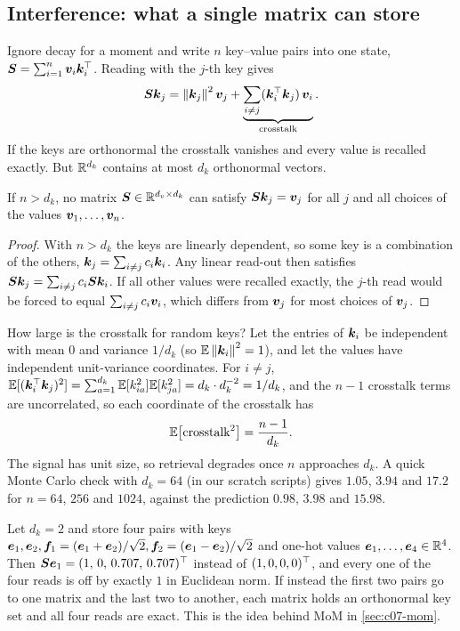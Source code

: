 \subsection{Interference: what a single matrix can store}\label{sec:c07-interference}

Ignore decay for a moment and write $n$ key--value pairs into one state,
$\bm{S} = \sum_{i=1}^{n} \bm{v}_i \bm{k}_i^{\top}$. Reading with the $j$-th key gives
\begin{equation}\label{eq:c07-crosstalk}
  \bm{S} \bm{k}_j = \left\lVert \bm{k}_j\right\rVert^2 \bm{v}_j + \underbrace{\sum_{i \ne j} (\bm{k}_i^{\top} \bm{k}_j)\, \bm{v}_i}_{\text{crosstalk}} .
\end{equation}
If the keys are orthonormal the crosstalk vanishes and every value is recalled exactly. But
$\mathbb{R}^{d_k}$ contains at most $d_k$ orthonormal vectors.

\begin{proposition}\label{prop:c07-capacity}
If $n > d_k$, no matrix $\bm{S} \in \mathbb{R}^{d_v \times d_k}$ can satisfy $\bm{S}\bm{k}_j = \bm{v}_j$ for all
$j$ and all choices of the values $\bm{v}_1, \dots, \bm{v}_n$.
\end{proposition}
\begin{proof}
With $n > d_k$ the keys are linearly dependent, so some key is a combination of the others,
$\bm{k}_j = \sum_{i \ne j} c_i \bm{k}_i$. Any linear read-out then satisfies
$\bm{S}\bm{k}_j = \sum_{i\ne j} c_i \bm{S}\bm{k}_i$. If all other values were recalled exactly, the
$j$-th read would be forced to equal $\sum_{i \ne j} c_i \bm{v}_i$, which differs from $\bm{v}_j$
for most choices of $\bm{v}_j$.
\end{proof}

How large is the crosstalk for random keys? Let the entries of $\bm{k}_i$ be independent with
mean $0$ and variance $1/d_k$ (so $\mathbb{E}\left\lVert \bm{k}_i\right\rVert^2 = 1$), and let the values have independent
unit-variance coordinates. For $i \ne j$,
$\mathbb{E}[(\bm{k}_i^{\top}\bm{k}_j)^2] = \sum_{a=1}^{d_k} \mathbb{E}[k_{ia}^2]\mathbb{E}[k_{ja}^2] = d_k \cdot d_k^{-2} = 1/d_k$,
and the $n-1$ crosstalk terms are uncorrelated, so each coordinate of the crosstalk has
\begin{equation}\label{eq:c07-crosstalk-var}
  \mathbb{E}\bigl[\text{crosstalk}^2\bigr] = \frac{n-1}{d_k}.
\end{equation}
The signal has unit size, so retrieval degrades once $n$ approaches $d_k$. A quick Monte
Carlo check with $d_k = 64$ (in our scratch scripts) gives $1.05$, $3.94$ and $17.2$ for
$n = 64$, $256$ and $1024$, against the prediction $0.98$, $3.98$ and $15.98$.

\begin{example}\label{ex:c07-four}
Let $d_k = 2$ and store four pairs with keys $\bm{e}_1, \bm{e}_2, \bm{f}_1 = (\bm{e}_1+\bm{e}_2)/\sqrt2,
\bm{f}_2 = (\bm{e}_1 - \bm{e}_2)/\sqrt2$ and one-hot values $\bm{e}_1,\dots,\bm{e}_4 \in \mathbb{R}^4$. Then
$\bm{S}\bm{e}_1 = (1,\, 0,\, 0.707,\, 0.707)^{\top}$ instead of $(1,0,0,0)^{\top}$, and every one of the four reads
is off by exactly $1$ in Euclidean norm. If instead the first two pairs go to one matrix and
the last two to another, each matrix holds an orthonormal key set and all four reads are
exact. This is the idea behind MoM in \cref{sec:c07-mom}.
\end{example}

